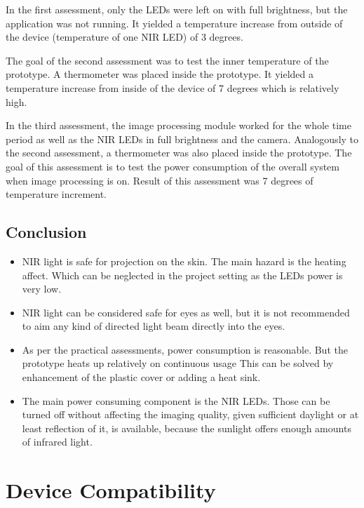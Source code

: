 In the first assessment, only the LEDs were left on with full brightness, but the application was not running. It yielded a temperature increase from outside of the device (temperature of one NIR LED) of 3 degrees.

The goal of the second assessment was to test the inner temperature of the prototype. A thermometer was placed inside the prototype. It yielded a temperature increase from inside of the device of 7 degrees which is relatively high.

In the third assessment, the image processing module worked for the whole time period as well as the NIR LEDs in full brightness and the camera. Analogously to the second assessment, a thermometer was also placed inside the prototype. The goal of this assessment is to test the power consumption of the overall system when image processing is on. Result of this assessment was 7 degrees of temperature increment.

\subsection{Conclusion }

\begin{itemize}

\item NIR light is safe for projection on the skin. The main hazard is the heating affect. Which can be neglected in the project setting as the LEDs power is very low. 
\item NIR light can be considered safe for eyes as well, but it is not recommended to aim any kind of directed light beam directly into the eyes.
\item As per the practical assessments, power consumption is reasonable. But the prototype heats up relatively on continuous usage This can be solved by enhancement of the plastic cover or adding a heat sink.
\item The main power consuming component is the NIR LEDs. Those can be turned off without affecting the imaging quality, given sufficient daylight or at least reflection of it, is available, because the sunlight offers enough amounts of infrared light.

\end{itemize}


\section{Device Compatibility}

